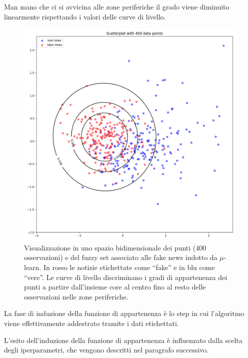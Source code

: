 \documentclass[12pt]{report}
\theoremstyle{definition}
\begin{document}
Man mano che ci si avvicina alle zone periferiche il grado viene diminuito linearmente rispettando i valori delle curve di livello.
\begin{figure}
    \centering
    \includegraphics[scale=0.44]{images/mulearn.png}
    \caption{Visualizzazione in uno spazio bidimensionale dei punti (400 osservazioni) e del fuzzy set associato alle fake news indotto da $\mu$-learn. In rosso le notizie etichettate come ``fake'' e in blu come ``vere''.
    Le curve di livello discriminano i gradi di appartenenza dei punti a partire dall'insieme core al centro fino al resto delle osservazioni nelle zone periferiche.}
    \label{mulearnplot}
\end{figure}
La fase di induzione della funzione di appartenenza è lo step in cui l'algoritmo viene effettivamente addestrato tramite i dati etichettati.

L'esito dell'induzione della funzione di appartenenza è influenzato dalla scelta degli iperparametri, che vengono descritti nel paragrafo successivo.
\end{document}
